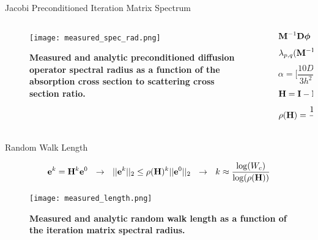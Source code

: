 \documentclass{beamer}
\begin{document}
\begin{frame}{Jacobi Preconditioned Iteration Matrix Spectrum}

  \begin{columns}

    \begin{column}{0.5\textwidth}
      \begin{figure}[t!]
        \begin{center}
          \texttt{[image: measured\_spec\_rad.png]}
        \end{center}
        \caption{\textbf{Measured and analytic preconditioned diffusion
            operator spectral radius as a function of the absorption cross
            section to scattering cross section ratio.}}
      \end{figure}
    \end{column}

    \begin{column}{0.5\textwidth}
      \[
        \mathbf{M}^{-1} \mathbf{D} \boldsymbol{\phi} = \mathbf{M}^{-1} \mathbf{s}
      \]
      \medskip
      \[
        \lambda_{p,q}(\mathbf{M}^{-1} \mathbf{D}) = \alpha \lambda_{p,q}(\mathbf{D})
      \]
      \medskip
      \[
      \alpha = \Bigg[\frac{10 D}{3 h^2} + \Sigma_a\Bigg]^{-1}
      \]
      \medskip
      \[
        \mathbf{H} = \mathbf{I} - \mathbf{M}^{-1} \mathbf{D}
      \]
      \medskip
      \[
        \rho(\mathbf{H}) = \frac{10 \alpha D}{3 h^2}
      \]
    \end{column}

  \end{columns}

\end{frame}

\begin{frame}{Random Walk Length}

  \[
  \ve{e}^{k} = \ve{H}^k\ve{e}^0 \ \ \rightarrow \ \ ||\ve{e}^{k}||_2
  \leq \rho(\ve{H})^k ||\ve{e}^0||_2 \ \ \rightarrow \ \ k \approx
  \frac{ \log(W_c) }{ \log( \rho(\ve{H}) ) }
  \]

  \bigskip
  \begin{figure}[t!]
    \begin{center}
      \texttt{[image: measured\_length.png]}
    \end{center}
    \caption{\textbf{Measured and analytic random walk length as a
        function of the iteration matrix spectral radius.}}
  \end{figure}

\end{frame}
\end{document}
